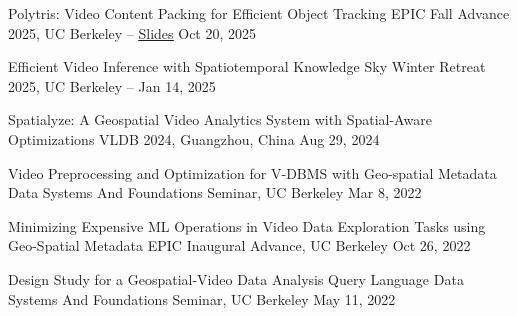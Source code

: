 

\begin{cvpubs}

  \cvpub
    {Polytris: Video Content Packing for Efficient Object Tracking} %
    {EPIC Fall Advance 2025, UC Berkeley -- \href{https://docs.google.com/presentation/d/1MjhupJdqI6HhQ_YVCmqgkgADnIKRZd7QUN3IO6w9rN4}{\underline{Slides}}} %
    {Oct 20, 2025} %
    {} %

  \cvpub
    {Efficient Video Inference with Spatiotemporal Knowledge} %
    {Sky Winter Retreat 2025, UC Berkeley -- \href{https://youtu.be/FaE254pkr1c}{\underline{}}} %
    {Jan 14, 2025} %
    {} %

  \cvpub
    {Spatialyze: A Geospatial Video Analytics System with Spatial-Aware Optimizations} %
    {VLDB 2024, Guangzhou, China} %
    {Aug 29, 2024} %
    {} %


  \cvpub
    {Video Preprocessing and Optimization for V-DBMS with Geo-spatial Metadata} %
    {Data Systems And Foundations Seminar, UC Berkeley} %
    {Mar 8, 2022} %
    {} %

  \cvpub
    {Minimizing Expensive ML Operations in Video Data Exploration Tasks using Geo-Spatial Metadata} %
    {EPIC Inaugural Advance, UC Berkeley} %
    {Oct 26, 2022} %
    {} %

  \cvpub
    {Design Study for a Geospatial-Video Data Analysis Query Language} %
    {Data Systems And Foundations Seminar, UC Berkeley} %
    {May 11, 2022} %
    {} %


\end{cvpubs}
